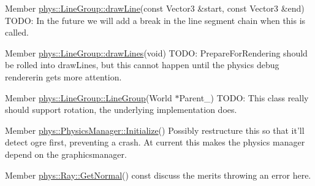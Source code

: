 \label{dd/da0/todo__todo000019}
\hypertarget{dd/da0/todo__todo000019}{}
 
\begin{DoxyDescription}
\item[Member \hyperlink{classphys_1_1LineGroup_a141db62ea17d94b9bce421e5df5a8d89}{phys::LineGroup::drawLine}(const Vector3 \&start, const Vector3 \&end) ]TODO: In the future we will add a break in the line segment chain when this is called. 
\end{DoxyDescription}

\label{dd/da0/todo__todo000020}
\hypertarget{dd/da0/todo__todo000020}{}
 
\begin{DoxyDescription}
\item[Member \hyperlink{classphys_1_1LineGroup_ade1bb4f8e1164e1b8d7aeabbc970b79d}{phys::LineGroup::drawLines}(void) ]TODO: PrepareForRendering should be rolled into drawLines, but this cannot happen until the physics debug rendererin gets more attention. 
\end{DoxyDescription}

\label{dd/da0/todo__todo000018}
\hypertarget{dd/da0/todo__todo000018}{}
 
\begin{DoxyDescription}
\item[Member \hyperlink{classphys_1_1LineGroup_a676039a6beec56d24c631e9da5fd7e76}{phys::LineGroup::LineGroup}(World $\ast$Parent\_\-) ]TODO: This class really should support rotation, the underlying implementation does. 
\end{DoxyDescription}

\label{dd/da0/todo__todo000023}
\hypertarget{dd/da0/todo__todo000023}{}
 
\begin{DoxyDescription}
\item[Member \hyperlink{classphys_1_1PhysicsManager_a28885be750bb763d957f122593815388}{phys::PhysicsManager::Initialize}() ]Possibly restructure this so that it'll detect ogre first, preventing a crash. At current this makes the physics manager depend on the graphicsmanager. 
\end{DoxyDescription}

\label{dd/da0/todo__todo000024}
\hypertarget{dd/da0/todo__todo000024}{}
 
\begin{DoxyDescription}
\item[Member \hyperlink{classphys_1_1Ray_a7445c25acb6ce865ef85e7ada829ccba}{phys::Ray::GetNormal}() const  ]discuss the merits throwing an error here. 
\end{DoxyDescription}

